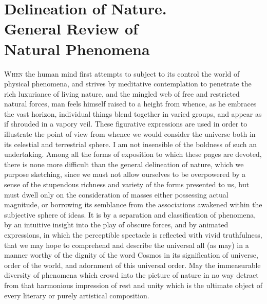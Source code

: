 
\chapter[Delineation Of Nature]{Delineation of Nature.\\General Review of\\ Natural Phenomena}

\lettrine[lines=4]{\goudy W}{hen} the human mind first attempts to subject to its control the world of physical phenomena, and strives by meditative contemplation to penetrate the rich luxuriance of living nature, and the mingled web of free and restricted natural forces, man feels himself raised to a height from whence, as he embraces the vast horizon, individual things blend together in varied groups, and appear as if shrouded in a vapory veil. These figurative expressions are used in order to illustrate the point of view from whence we would consider the universe both in its celestial and terrestrial sphere. I am not insensible of the boldness of such an undertaking. Among all the forms of exposition to which these pages are devoted, there is none more difficult than the general delineation of nature, which we purpose sketching, since we must not allow ourselves to be overpowered by a sense of the stupendous richness and variety of the forms presented to us, but must dwell only on the consideration of masses either possessing actual magnitude, or borrowing its semblance from the associations awakened within the subjective sphere of ideas. It is by a separation and classification of phenomena, by an intuitive insight into the play of obscure forces, and by animated expressions, in which the perceptible spectacle is reflected with vivid truthfulness, that we may hope to comprehend and describe the universal all (as may) in a manner worthy of the dignity of the word Cosmos in its signification of universe, order of the world, and adornment of this universal order. May the immeasurable diversity of phenomena which crowd into the picture of nature in no way detract from that harmonious impression of rest and unity which is the ultimate object of every literary or purely artistical composition.


